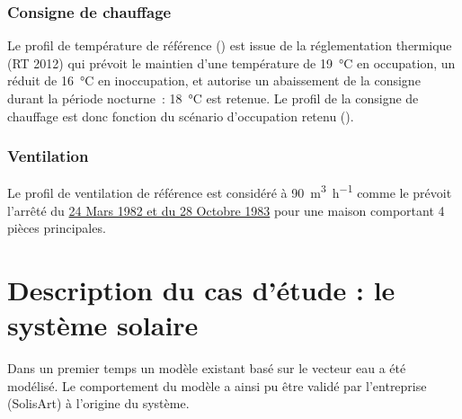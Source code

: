 

\subsubsection{Consigne de chauffage} %
\label{ssub:consigne_de_chauffage}
Le profil de température de référence () est issue de la réglementation thermique (RT
2012) qui prévoit le maintien d’une température de \SI{19}{\celsius} en occupation, un
réduit de \SI{16}{\celsius} en inoccupation, et autorise un abaissement de la consigne durant la
période nocturne~: \SI{18}{\celsius} est retenue. Le profil de la consigne de chauffage
est donc fonction du scénario d’occupation retenu ().

\subsubsection{Ventilation} %
\label{ssub:ventilation_ref}
Le profil de ventilation de référence est considéré à \SI{90}{\meter\cubed\per\hour}
comme le prévoit l’arrêté du \href{https://www.legifrance.gouv.fr/affichTexte.do?cidTexte=JORFTEXT000000862344}{24 Mars
1982 et du 28 Octobre 1983} pour une maison comportant 4 pièces principales.



\section{Description du cas d’étude : le système solaire} %
\label{sec:description_du_cas_d_etude_le_systeme_solaire}
Dans un premier temps un modèle existant basé sur le vecteur eau a été modélisé.
Le comportement du modèle a ainsi pu être validé par l’entreprise (SolisArt) à
l’origine du système.

